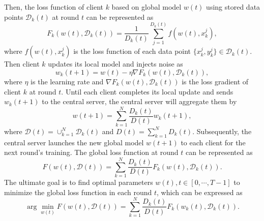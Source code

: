 \documentclass{article}
\theoremstyle{plain}
\theoremstyle{definition}
\theoremstyle{remark}
\begin{document}
Then, the loss function of client $k$ based on global model $w(t)$ using stored data points $\mathcal{D}_k(t)$ at round $t$ can be represented as 
\begin{equation}
  F_k(w(t), \mathcal{D}_k(t)) = \frac{1}{D_k(t)} \sum_{j=1}^{D_k(t)} f(w(t), x_k^j),
\end{equation}
where $f(w(t), x_k^j)$ is the loss function of each data point $\{x_k^j, y_k^j\} \in \mathcal{D}_k(t)$.
Then client $k$ updates its local model and injects noise as
\begin{equation}
  w_k(t+1) = w(t) - \eta \nabla F_k(w(t), \mathcal{D}_k(t)),
\end{equation}
where $\eta$ is the learning rate and $\nabla F_k(w(t), \mathcal{D}_k(t))$ is the loss gradient of client $k$ at round $t$. 
Until each client completes its local update and sends $w_k(t+1)$ to the central server, the central server will aggregate them by
\begin{equation}
  w(t+1) = \sum_{k=1}^{N} \frac{D_k(t)}{D(t)} w_k(t+1),
\end{equation}
where $\mathcal{D}(t) = \cup_{k=1}^N \mathcal{D}_k(t)$ and $D(t) = \sum_{k=1}^{N} D_k(t)$.
Subsequently, the central server launches the new global model $w(t+1)$ to each client for the next round's training.
The global loss function at round $t$ can be represented as
\begin{equation}
  F(w(t), \mathcal{D}(t)) = \sum_{k=1}^{N} \frac{D_k(t)}{D(t)} F_k(w(t), \mathcal{D}_k(t)).
\end{equation}
The ultimate goal is to find optimal parameters $w(t), t \in [0, \cdots, T-1]$ to minimize the global loss function in each round $t$, which can be expressed as
\begin{equation}
  \arg \min_{w(t)} F(w(t), \mathcal{D}(t)) = \sum_{k=1}^{N} \frac{D_k(t)}{D(t)} F_k(w_k(t), \mathcal{D}_k(t)).
\end{equation}
\end{document}
